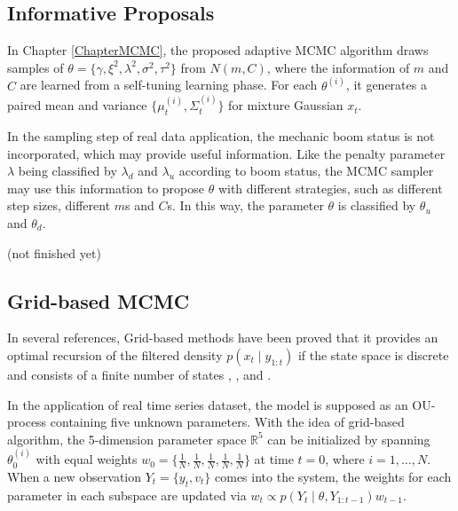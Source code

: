 \subsection*{Informative Proposals}

In Chapter \ref{ChapterMCMC}, the proposed adaptive MCMC algorithm draws samples of $\theta=\{\gamma,\xi^2,\lambda^2,\sigma^2,\tau^2\}$ from $N(m,C)$, where the information of $m$ and $C$ are learned from a self-tuning learning phase. For each $\theta^{(i)}$, it generates a paired mean and variance $\{\mu_t^{(i)},\Sigma_t^{(i)}\}$ for mixture Gaussian $x_t$. 

In the sampling step of real data application, the mechanic boom status is not incorporated, which may provide useful information. Like the penalty parameter $\lambda$ being classified by $\lambda_d$ and $\lambda_u$ according to boom status, the MCMC sampler may use this information to propose $\theta$ with different strategies, such as different step sizes, different $m$s and $C$s. In this way, the parameter $\theta$ is classified by $\theta_u$ and $\theta_d$. 

(not finished yet)



\subsection*{Grid-based MCMC}

In several references, Grid-based methods have been proved that it provides an optimal recursion of the filtered density $p(x_t\mid y_{1:t})$ if the state space is discrete and consists of a finite number of states \cite{ristic2004beyond}, \cite{stroud2016bayesian}, \cite{arulampalam2002tutorial} and \cite{hartmann2016grid}. 

In the application of real time series dataset, the model is supposed as an OU-process containing five unknown parameters. With the idea of grid-based algorithm, the 5-dimension parameter space $\mathbb{R}^5$ can be initialized by spanning $\theta_0^{(i)}$ with equal weights $w_0=\{\frac{1}{N},\frac{1}{N},\frac{1}{N},\frac{1}{N},\frac{1}{N}\}$ at time $t=0$, where $i=1,\ldots,N$. When a new observation $Y_t=\{y_t,v_t\}$ comes into the system, the weights for each parameter in each subspace are updated via $w_t\propto p(Y_t\mid \theta,Y_{1:t-1})w_{t-1}$. 

